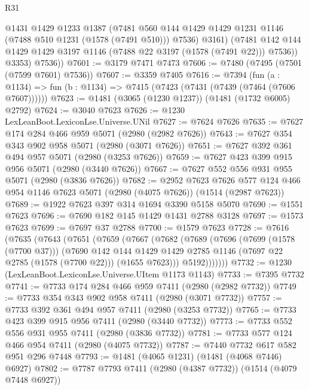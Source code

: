 \begin{lexlean}{R31}
\begin{coremodule}
              @1431
              @1429
              @1233
              @1387
              (@7481
                @560
                @144
                @1429
                @1429
                @1231
                @1146
                (@7488 @510 @1231 (@1578 (@7491 @510)))
                @7536)
              @3161)
            (@7481 @142 @144 @1429 @1429 @3197 @1146 (@7488 @22 @3197 (@1578 (@7491 @22))) @7536))
          @3353)
        @7536))
@7601 := @3179 @7471 @7473
@7606 := @7480 (@7495 (@7501 (@7599 @7601) @7536))
@7607 := @3359 @7405
@7616 := @7394
    (fun (a : @1134) => fun (b : @1134) => @7415 (@7423 (@7431 (@7439 (@7464 (@7606 @7607))))))
@7623 := @1481 (@3065 (@1230 @1237)) (@1481 (@1732 @6005) @2792)
@7624 := @3040 @7623
@7626 := @1230 LexLeanBoot.LexiconLse.Universe.UNil
@7627 := @7624 @7626
@7635 := @7627 @174 @284 @466 @959 @5071 (@2980 (@2982 @7626))
@7643 := @7627 @354 @343 @902 @958 @5071 (@2980 (@3071 @7626))
@7651 := @7627 @392 @361 @494 @957 @5071 (@2980 (@3253 @7626))
@7659 := @7627 @423 @399 @915 @956 @5071 (@2980 (@3440 @7626))
@7667 := @7627 @552 @556 @931 @955 @5071 (@2980 (@3836 @7626))
@7682 := @2952
    @7623
    @7626
    @577
    @124
    @466
    @954
    @1146
    @7623
    @5071
    (@2980 (@4075 @7626))
    (@1514 (@2987 @7623))
@7689 := @1922 @7623 @397 @314 @1694 @3390 @5158 @5070
@7690 := @1551 @7623
@7696 := @7690 @182 @145 @1429 @1431 @2788 @3128
@7697 := @1573 @7623
@7699 := @7697 @37 @2788
@7700 := @1579 @7623
@7728 := @7616
    (@7635
      (@7643
        (@7651
          (@7659
            (@7667
              (@7682
                (@7689
                  (@7696
                    (@7699 (@1578 (@7700 @37)))
                    (@7690
                      @142
                      @144
                      @1429
                      @1429
                      @2785
                      @1146
                      (@7697 @22 @2785 (@1578 (@7700 @22)))
                      (@1655 @7623)))
                  @5192)))))))
@7732 := @1230 (LexLeanBoot.LexiconLse.Universe.UItem @1173 @1143)
@7733 := @7395 @7732
@7741 := @7733 @174 @284 @466 @959 @7411 (@2980 (@2982 @7732))
@7749 := @7733 @354 @343 @902 @958 @7411 (@2980 (@3071 @7732))
@7757 := @7733 @392 @361 @494 @957 @7411 (@2980 (@3253 @7732))
@7765 := @7733 @423 @399 @915 @956 @7411 (@2980 (@3440 @7732))
@7773 := @7733 @552 @556 @931 @955 @7411 (@2980 (@3836 @7732))
@7781 := @7733 @577 @124 @466 @954 @7411 (@2980 (@4075 @7732))
@7787 := @7440 @7732 @617 @582 @951 @296 @7448
@7793 := @1481 (@4065 @1231) (@1481 (@4068 @7446) @6927)
@7802 := @7787 @7793 @7411 (@2980 (@4387 @7732)) (@1514 (@4079 @7448 @6927))

\end{coremodule}
\end{lexlean}
